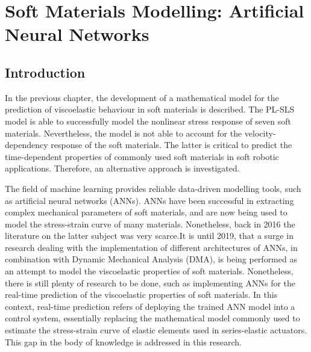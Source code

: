 \chapter{Soft Materials Modelling: Artificial Neural Networks} 
\label{ch6:ANN}

\section{Introduction} 

In the previous chapter, the development of a mathematical model for the prediction of viscoelastic behaviour in soft materials is described. The PL-SLS model is able to successfully model the nonlinear stress response of seven soft materials. Nevertheless, the model is not able to account for the velocity-dependency response of the soft materials. The latter is critical to predict the time-dependent properties of commonly used soft materials in soft robotic applications. Therefore, an alternative approach is investigated.

The field of machine learning provides reliable data-driven modelling tools, such as artificial neural networks (ANNs). ANNs have been successful in extracting complex mechanical parameters of soft materials, and are now being used to model the stress-strain curve of many materials. Nonetheless, back in 2016 the literature on the latter subject was very scarce.It is until 2019, that a surge in research dealing with the implementation of different architectures of ANNs, in combination with Dynamic Mechanical Analysis (DMA), is being performed as an attempt to model the viscoelastic properties of soft materials. Nonetheless, there is still plenty of research to be done, such as implementing ANNs for the real-time prediction of the viscoelastic properties of soft materials. In this context, real-time prediction refers of deploying the trained ANN model into a control system, essentially replacing the mathematical model commonly used to estimate the stress-strain curve of elastic elements  used in series-elastic actuators. This gap in the body of knowledge is addressed in this research.


